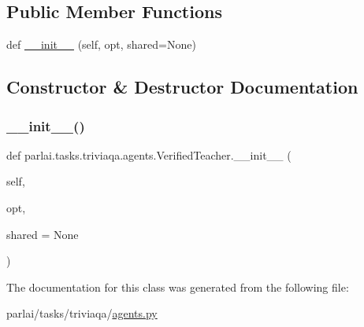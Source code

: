 \subsection*{Public Member Functions}
\begin{DoxyCompactItemize}
\item 
def \hyperlink{classparlai_1_1tasks_1_1triviaqa_1_1agents_1_1VerifiedTeacher_abef3ebd81d68d58d356a27bca5ec036c}{\+\_\+\+\_\+init\+\_\+\+\_\+} (self, opt, shared=None)
\end{DoxyCompactItemize}


\subsection{Constructor \& Destructor Documentation}
\mbox{\label{classparlai_1_1tasks_1_1triviaqa_1_1agents_1_1VerifiedTeacher_abef3ebd81d68d58d356a27bca5ec036c}} 
\subsubsection{\texorpdfstring{\+\_\+\+\_\+init\+\_\+\+\_\+()}{\_\_init\_\_()}}
{\footnotesize\ttfamily def parlai.\+tasks.\+triviaqa.\+agents.\+Verified\+Teacher.\+\_\+\+\_\+init\+\_\+\+\_\+ (\begin{DoxyParamCaption}\item[{}]{self,  }\item[{}]{opt,  }\item[{}]{shared = {\ttfamily None} }\end{DoxyParamCaption})}



The documentation for this class was generated from the following file\+:\begin{DoxyCompactItemize}
\item 
parlai/tasks/triviaqa/\hyperlink{parlai_2tasks_2triviaqa_2agents_8py}{agents.\+py}\end{DoxyCompactItemize}
